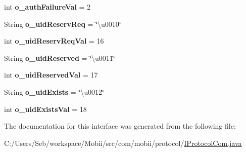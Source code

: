 \begin{DoxyCompactItemize}
\item 
\hypertarget{interfacecom_1_1mobii_1_1protocol_1_1_i_protocol_com_aab7afee67c23f8a17ae03b40179a2c2d}{int {\bfseries o\-\_\-auth\-Failure\-Val} = 2}\label{interfacecom_1_1mobii_1_1protocol_1_1_i_protocol_com_aab7afee67c23f8a17ae03b40179a2c2d}

\item 
\hypertarget{interfacecom_1_1mobii_1_1protocol_1_1_i_protocol_com_ad60db23dda2f46d7b3a71552e20e3d66}{String {\bfseries o\-\_\-uid\-Reserv\-Req} = \char`\"{}\textbackslash{}u0010\char`\"{}}\label{interfacecom_1_1mobii_1_1protocol_1_1_i_protocol_com_ad60db23dda2f46d7b3a71552e20e3d66}

\item 
\hypertarget{interfacecom_1_1mobii_1_1protocol_1_1_i_protocol_com_ab0d3fca81c7dc067db2509dcb25ccf95}{int {\bfseries o\-\_\-uid\-Reserv\-Req\-Val} = 16}\label{interfacecom_1_1mobii_1_1protocol_1_1_i_protocol_com_ab0d3fca81c7dc067db2509dcb25ccf95}

\item 
\hypertarget{interfacecom_1_1mobii_1_1protocol_1_1_i_protocol_com_ae96df75d45ffc16e79a86389f27fd7d1}{String {\bfseries o\-\_\-uid\-Reserved} = \char`\"{}\textbackslash{}u0011\char`\"{}}\label{interfacecom_1_1mobii_1_1protocol_1_1_i_protocol_com_ae96df75d45ffc16e79a86389f27fd7d1}

\item 
\hypertarget{interfacecom_1_1mobii_1_1protocol_1_1_i_protocol_com_a6e442a0448aaef102d28e906f34e46e9}{int {\bfseries o\-\_\-uid\-Reserved\-Val} = 17}\label{interfacecom_1_1mobii_1_1protocol_1_1_i_protocol_com_a6e442a0448aaef102d28e906f34e46e9}

\item 
\hypertarget{interfacecom_1_1mobii_1_1protocol_1_1_i_protocol_com_adcdf7df181d5326c2463584e8f31ac5f}{String {\bfseries o\-\_\-uid\-Exists} = \char`\"{}\textbackslash{}u0012\char`\"{}}\label{interfacecom_1_1mobii_1_1protocol_1_1_i_protocol_com_adcdf7df181d5326c2463584e8f31ac5f}

\item 
\hypertarget{interfacecom_1_1mobii_1_1protocol_1_1_i_protocol_com_a413c418c82abe9a71fefc1a490510108}{int {\bfseries o\-\_\-uid\-Exists\-Val} = 18}\label{interfacecom_1_1mobii_1_1protocol_1_1_i_protocol_com_a413c418c82abe9a71fefc1a490510108}

\end{DoxyCompactItemize}


The documentation for this interface was generated from the following file\-:\begin{DoxyCompactItemize}
\item 
C\-:/\-Users/\-Seb/workspace/\-Mobii/src/com/mobii/protocol/\hyperlink{_i_protocol_com_8java}{I\-Protocol\-Com.\-java}\end{DoxyCompactItemize}

